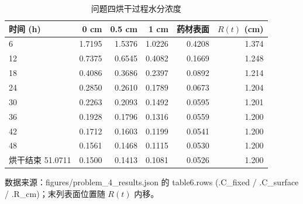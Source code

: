 \begin{table}[H]
  \centering
  \caption{问题四烘干过程水分浓度}
  \label{tab:q4_C}
  \begin{tabular}{lrrrrr}
    \toprule
    时间 (h) & 0 cm & 0.5 cm & 1 cm & 药材表面 & $R(t)$ (cm) \\
    \midrule
    6 & 1.7195 & 1.5376 & 1.0226 & 0.4208 & 1.374 \\
    12 & 0.7375 & 0.6545 & 0.4082 & 0.1669 & 1.248 \\
    18 & 0.4086 & 0.3686 & 0.2397 & 0.0892 & 1.214 \\
    24 & 0.2850 & 0.2610 & 0.1789 & 0.0673 & 1.204 \\
    30 & 0.2263 & 0.2093 & 0.1492 & 0.0595 & 1.201 \\
    36 & 0.1928 & 0.1796 & 0.1316 & 0.0559 & 1.200 \\
    42 & 0.1712 & 0.1603 & 0.1199 & 0.0541 & 1.200 \\
    48 & 0.1561 & 0.1468 & 0.1115 & 0.0530 & 1.200 \\
    烘干结束 51.0711 & 0.1500 & 0.1413 & 0.1081 & 0.0526 & 1.200 \\
    \bottomrule
  \end{tabular}
  \par\vspace{2pt}\footnotesize 数据来源：figures/problem\_4\_results.json 的 table6.rows (.C\_fixed / .C\_surface / .R\_cm)；末列表面位置随 $R(t)$ 内移。
\end{table}
